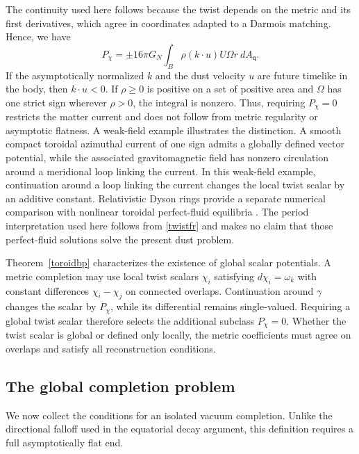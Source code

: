 \documentclass[amsmath,amsfonts,amssymb,aps,pra,superscriptaddress,10pt]{revtex4-2}
\numberwithin{equation}{section}
\theoremstyle{plain}
\theoremstyle{definition}
\theoremstyle{remark}
\theoremstyle{definition}
\begin{document}
The continuity used here follows because the twist depends on the metric and its first derivatives, which agree in coordinates adapted to a Darmois matching. Hence, we have
\begin{equation}\label{twistfr}
P_\chi=\pm 16\pi G_N\int_B\rho(k\cdot u)U\Omega r~dA_{\mathsf{q}}.
\end{equation}
If the asymptotically normalized $k$ and the dust velocity $u$ are future timelike in the body, then $k\cdot u<0$. If $\rho\geq 0$ is positive on a set of positive area and $\Omega$ has one strict sign wherever $\rho>0$, the integral is nonzero. Thus, requiring $P_\chi=0$ restricts the matter current and does not follow from metric regularity or asymptotic flatness. A weak-field example illustrates the distinction. A smooth compact toroidal azimuthal current of one sign admits a globally defined vector potential, while the associated gravitomagnetic field has nonzero circulation around a meridional loop linking the current. In this weak-field example, continuation around a loop linking the current changes the local twist scalar by an additive constant. Relativistic Dyson rings provide a separate numerical comparison with nonlinear toroidal perfect-fluid equilibria \cite{Ansorg2003}. The period interpretation used here follows from \eqref{twistfr} and makes no claim that those perfect-fluid solutions solve the present dust problem.

Theorem~\ref{toroidbp} characterizes the existence of global scalar
potentials. A metric completion may use local twist scalars $\chi_i$
satisfying $d\chi_i=\omega_k$ with constant differences
$\chi_i-\chi_j$ on connected overlaps. Continuation around $\gamma$
changes the scalar by $P_\chi$, while its differential remains
single-valued. Requiring a global twist scalar therefore selects
the additional subclass $P_\chi=0$. Whether the twist scalar is
global or defined only locally, the metric coefficients must agree
on overlaps and satisfy all reconstruction conditions.


\subsection{The global completion problem}

We now collect the conditions for an isolated vacuum completion. Unlike the directional falloff used in the equatorial decay argument, this definition requires a full asymptotically flat end.
\end{document}
